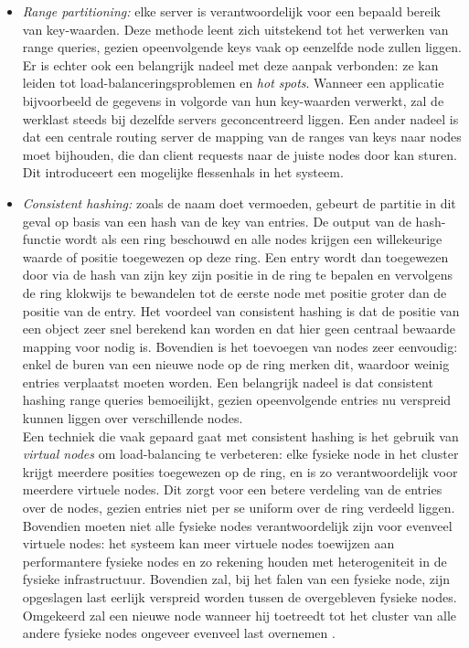 \begin{itemize}
\item \textit{Range partitioning:} elke server is verantwoordelijk voor een bepaald bereik van key-waarden. Deze methode leent zich uitstekend tot het verwerken van range queries, gezien opeenvolgende keys vaak op eenzelfde node zullen liggen. Er is echter ook een belangrijk nadeel met deze aanpak verbonden: ze kan leiden tot load-balanceringsproblemen en \textit{hot spots}. Wanneer een applicatie bijvoorbeeld de gegevens in volgorde van hun key-waarden verwerkt, zal de werklast steeds bij dezelfde servers geconcentreerd liggen. Een ander nadeel is dat een centrale routing server de mapping van de ranges van keys naar nodes moet bijhouden, die dan client requests naar de juiste nodes door kan sturen. Dit introduceert een mogelijke flessenhals in het systeem.
\item \textit{Consistent hashing:} zoals de naam doet vermoeden, gebeurt de partitie in dit geval op basis van een hash van de key van entries. De output van de hash-functie wordt als een ring beschouwd en alle nodes krijgen een willekeurige waarde of positie toegewezen op deze ring. Een entry wordt dan toegewezen door via de hash van zijn key zijn positie in de ring te bepalen en vervolgens de ring klokwijs te bewandelen tot de eerste node met positie groter dan de positie van de entry. Het voordeel van consistent hashing is dat de positie van een object zeer snel berekend kan worden en dat hier geen centraal bewaarde mapping voor nodig is. Bovendien is het toevoegen van nodes zeer eenvoudig: enkel de buren van een nieuwe node op de ring merken dit, waardoor weinig entries verplaatst moeten worden. Een belangrijk nadeel is dat consistent hashing range queries bemoeilijkt, gezien opeenvolgende entries nu verspreid kunnen liggen over verschillende nodes.\\
Een techniek die vaak gepaard gaat met consistent hashing is het gebruik van \textit{virtual nodes} om load-balancing te verbeteren: elke fysieke node in het cluster krijgt meerdere posities toegewezen op de ring, en is zo verantwoordelijk voor meerdere virtuele nodes. Dit zorgt voor een betere verdeling van de entries over de nodes, gezien entries niet per se uniform over de ring verdeeld liggen. Bovendien moeten niet alle fysieke nodes verantwoordelijk zijn voor evenveel virtuele nodes: het systeem kan meer virtuele nodes toewijzen aan performantere fysieke nodes en zo rekening houden met heterogeniteit in de fysieke infrastructuur. Bovendien zal, bij het falen van een fysieke node, zijn opgeslagen last eerlijk verspreid worden tussen de overgebleven fysieke nodes. Omgekeerd zal een nieuwe node wanneer hij toetreedt tot het cluster van alle andere fysieke nodes ongeveer evenveel last overnemen  \cite{grolinger2013data}\cite{decandia2007dynamo}.
\end{itemize}  

